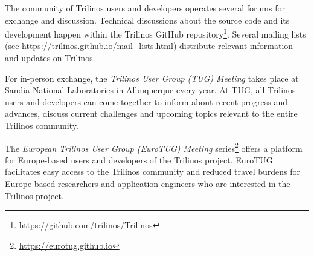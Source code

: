 
The community of Trilinos users and developers operates several forums for exchange and discussion.
Technical discussions about the source code and its development happen within the Trilinos GitHub repository\footnote{\url{https://github.com/trilinos/Trilinos}}.
Several mailing lists (see \url{https://trilinos.github.io/mail_lists.html}) distribute relevant information and updates on Trilinos.

For in-person exchange, the \emph{Trilinos User Group (TUG) Meeting} takes place at Sandia National Laboratories in Albuquerque every year.
At TUG, all Trilinos users and developers can come together to inform about recent progress and advances,
discuss current challenges and upcoming topics relevant to the entire Trilinos community.

The \emph{European Trilinos User Group (EuroTUG) Meeting} series\footnote{\url{https://eurotug.github.io}}
offers a platform for Europe-based users and developers of the Trilinos project.
EuroTUG facilitates easy access to the Trilinos community and reduced travel burdens for Europe-based researchers and application engineers
who are interested in the Trilinos project.
